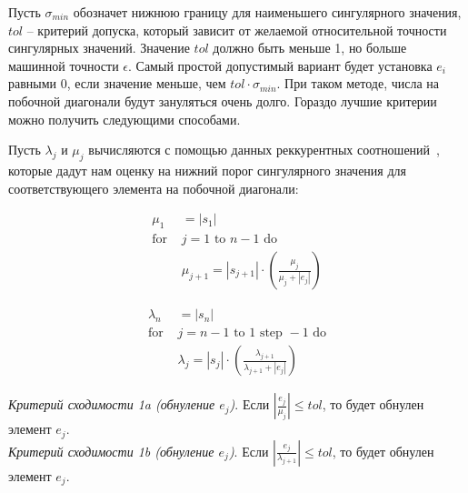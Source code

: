 Пусть $\sigma_{min}$ обозначет нижнюю границу для наименьшего сингулярного значения, $tol$ \--- критерий допуска, который зависит от желаемой относительной точности сингулярных значений. Значение $tol$ должно быть меньше 1, но больше машинной точности $\epsilon$. Самый простой допустимый вариант будет установка $e_i$ равными 0, если значение меньше, чем $tol\cdot\sigma_{min}$. При таком методе, числа на побочной диагонали будут зануляться очень долго. Гораздо лучшие критерии можно получить следующими способами.

Пусть $\lambda_j$ и $\mu_j$ вычисляются с помощью данных реккурентных соотношений~\cite{Demmel1990}, которые дадут нам оценку на нижний порог сингулярного значения для соответствующего элемента на побочной диагонали:

\begin{minipage}{0.48\textwidth}
\begin{align*}
\mu_1& = |s_1| \\
\text{for }& j = 1 \text{ to } n-1 \text{ do} \\
&\mu_{j+1} = |s_{j+1}| \cdot \left( \frac{\mu_j}{\mu_j + |e_j|} \right)
\end{align*}
\end{minipage}
\hfill
\begin{minipage}{0.48\textwidth}
\begin{align*}
\lambda_n& = |s_n| \\
\text{for }& j = n-1 \text{ to } 1 \text{ step } -1 \text{ do} \\
&\lambda_j = |s_j| \cdot \left( \frac{\lambda_{j+1}}{\lambda_{j+1} + |e_j|} \right)
\end{align*}
\end{minipage}
\vspace{1em}

\noindent\textit{Критерий сходимости 1a (обнуление $e_j$)}. Если $|\frac{e_j}{\mu_j}|\leq tol$, то будет обнулен элемент $e_j$.\vspace{1em}
\\\textit{Критерий сходимости 1b (обнуление $e_j$)}. Если $|\frac{e_j}{\lambda_{j+1}}|\leq tol$, то будет обнулен элемент $e_j$.\vspace{1em}

